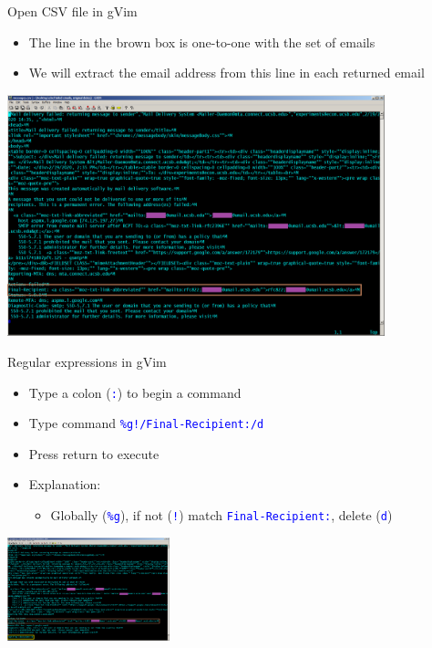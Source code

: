 \documentclass[professionalfont,10pt]{beamer}
\begin{document}
\begin{frame}{Open CSV file in gVim}
\begin{itemize}
\item The line in the brown box is one-to-one with the set of emails
\item We will extract the email address from this line in each returned email
\end{itemize}
\vspace{0.25cm}
\includegraphics[height=7cm]{vim-csv-0.png}
\end{frame}

\begin{frame}{Regular expressions in gVim}
\begin{itemize}
\item Type a colon (\textcolor{blue}{\texttt{:}}) to begin a command
\item Type command \textcolor{blue}{\texttt{\%g!/Final-Recipient:/d}}
\item Press return to execute
\vspace{0.25cm}
\item Explanation:
\begin{itemize}
\item Globally (\textcolor{blue}{\texttt{\%g}}), if not (\textcolor{blue}{\texttt{!}}) match \textcolor{blue}{\texttt{Final-Recipient:}}, delete (\textcolor{blue}{\texttt{d}})
\end{itemize}
\end{itemize}
\vspace{0.25cm}
\includegraphics[height=3cm,trim=0 0 0 16cm,clip]{vim-csv-1.png}
\end{frame}
\end{document}
